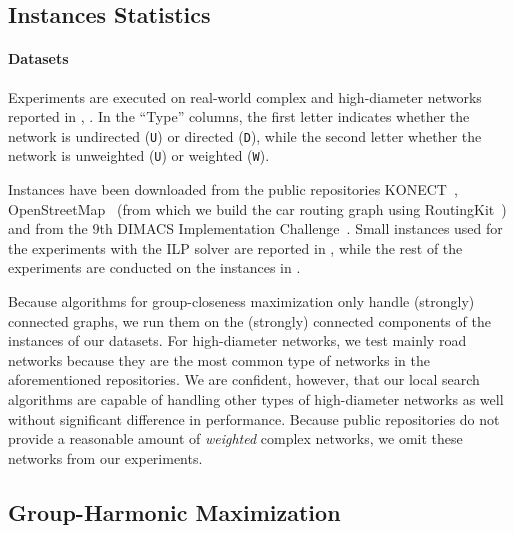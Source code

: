 \subsection{Instances Statistics}
%
\paragraph{Datasets}
Experiments are executed on real-world complex and high-diameter networks
reported in
,
. In the \enquote{Type} columns, the first letter
indicates whether the network is
undirected (\texttt{U}) or directed (\texttt{D}), while the second letter
whether the network is unweighted (\texttt{U}) or weighted (\texttt{W}).

Instances have been downloaded from the public repositories
KONECT~\cite{kunegis2013konect}, OpenStreetMap~\cite{OpenStreetMap} (from
which we build the car routing graph using
RoutingKit~\cite{DBLP:journals/jea/DibbeltSW16}) and from the 9th DIMACS
Implementation Challenge~\cite{demetrescu2009shortest}. Small instances used
for the experiments with the ILP solver are reported in
, while the rest
of the experiments are conducted on the instances in
.

Because algorithms for group-closeness maximization only handle (strongly)
connected graphs, we run them on the (strongly) connected components of the
instances of our datasets. For high-diameter networks, we test mainly road
networks because they are the most common type of networks in the
aforementioned repositories. We are confident, however, that our local search
algorithms are capable of handling other types of high-diameter networks
as well without significant difference in performance.
Because public repositories do not provide a reasonable amount of
\emph{weighted} complex networks, we omit these networks from our experiments.

\subsection{Group-Harmonic Maximization}
\label{sec:gh-gc:exp-gh-max}
